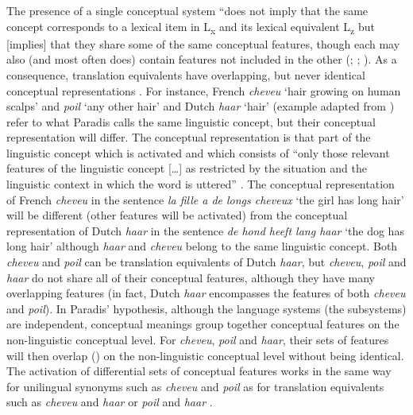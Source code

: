 The presence of a single conceptual system “does not imply that the same concept corresponds to a lexical item in L\textsubscript{x} and its lexical equivalent L\textsubscript{z} but [implies] that they share some of the same conceptual features, though each may also (and most often does) contain features not included in the other (\citealt{paradis_bilingual_1978, auger_representation_1997}; \citealt[198]{paradis_neurolinguistic_2004}; \citealt{de_groot_lexical_1997,Costaetal2000}). As a consequence, translation equivalents have overlapping, but never identical conceptual representations \citep[12]{kecskes_neurofunctional_2007}. For instance, French \textit{cheveu} `hair growing on human scalps' and \textit{poil} `any other hair' and Dutch \textit{haar} `hair' (example adapted from \citealt[201]{paradis_neurolinguistic_2004}) refer to what Paradis calls the same linguistic concept, but their conceptual representation will differ. The conceptual representation is that part of the linguistic concept which is activated and which consists of “only those relevant features of the linguistic concept […] as restricted by the situation and the linguistic context in which the word is uttered” \citep[12]{kecskes_neurofunctional_2007}. The conceptual representation of French \textit{cheveu} in the sentence \textit{la fille a de longs cheveux} `the girl has long hair' will be different (other features will be activated) from the conceptual representation of Dutch \textit{haar} in the sentence \textit{de hond heeft lang haar} `the dog has long hair' although \textit{haar} and \textit{cheveu} belong to the same linguistic concept. Both \textit{cheveu} and \textit{poil} can be translation equivalents of Dutch \textit{haar}, but \textit{cheveu}, \textit{poil} and \textit{haar} do not share all of their conceptual features, although they have many overlapping features (in fact, Dutch \textit{haar} encompasses the features of both \textit{cheveu} and \textit{poil}). In Paradis’ hypothesis, although the language systems (the subsystems) are independent, conceptual meanings group together conceptual features on the non-linguistic conceptual level. For \textit{cheveu}, \textit{poil} and \textit{haar}, their sets of features will then overlap (\citeyear[13]{kecskes_neurofunctional_2007}) on the non-linguistic conceptual level without being identical. The activation of differential sets of conceptual features works in the same way for unilingual synonyms such as \textit{cheveu} and \textit{poil} as for translation equivalents such as \textit{cheveu} and \textit{haar} or \textit{poil} and \textit{haar} \citep[14]{kecskes_neurofunctional_2007}.

